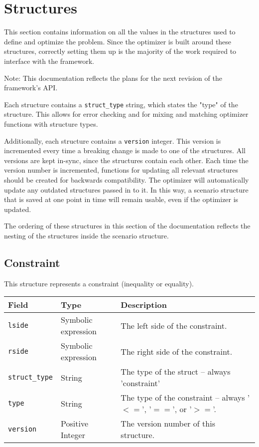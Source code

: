 \documentclass{article}
\begin{document}
	\section{Structures}
		This section contains information on all the values in the structures used to define and optimize the problem.
		Since the optimizer is built around these structures, correctly setting them up is the majority of the work required to
		interface with the framework.

		Note: This documentation reflects the plans for the next revision of the framework's API.

		Each structure contains a \lstinline|struct_type| string, which states the "type" of the structure.
		This allows for error checking and for mixing and matching optimizer functions with structure types.

		Additionally, each structure contains a \lstinline|version| integer. This version is incremented every time a breaking
		change is made to one of the structures. All versions are kept in-sync, since the structures contain each other.
		Each time the version number is incremented, functions for updating all relevant structures should be created for backwards
		compatibility. The optimizer will automatically update any outdated structures passed in to it. In this way, a scenario structure
		that is saved at one point in time will remain usable, even if the optimizer is updated.

		The ordering of these structures in this section of the documentation reflects
		the nesting of the structures inside the scenario structure.

		\subsection{Constraint}
			\label{sec:constraint} %

			This structure represents a constraint (inequality or equality).

			\vspace{\baselineskip}

			\begin{tabular}{ p{} | p{} | p{152pt}}
				Field                    & Type    & Description                                                                 \\ \hline
				\lstinline|lside| & \raggedright Symbolic expression & The left side of the constraint.                          \\[1ex]
				\lstinline|rside| & \raggedright Symbolic expression & The right side of the constraint.                         \\[1ex]
				\lstinline|struct_type|  & String  & The type of the struct -- always 'constraint'                               \\[1ex]
				\lstinline|type| & String & The type of the constraint -- always '$<=$', '$==$', or '$>=$'.                            \\[1ex]
				\lstinline|version| & \raggedright Positive Integer & The version number of this structure.
			\end{tabular}
\end{document}
